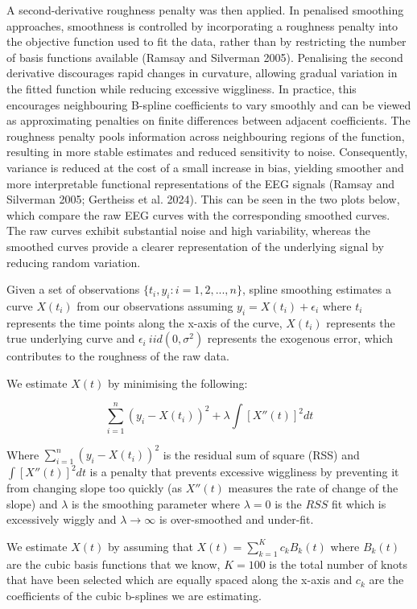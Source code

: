 \documentclass{article}
\begin{document}
A second-derivative roughness penalty was then applied. In penalised
smoothing approaches, smoothness is controlled by incorporating a
roughness penalty into the objective function used to fit the data,
rather than by restricting the number of basis functions available
(Ramsay and Silverman 2005). Penalising the second derivative
discourages rapid changes in curvature, allowing gradual variation in
the fitted function while reducing excessive wiggliness. In practice,
this encourages neighbouring B-spline coefficients to vary smoothly and
can be viewed as approximating penalties on finite differences between
adjacent coefficients. The roughness penalty pools information across
neighbouring regions of the function, resulting in more stable estimates
and reduced sensitivity to noise. Consequently, variance is reduced at
the cost of a small increase in bias, yielding smoother and more
interpretable functional representations of the EEG signals (Ramsay and
Silverman 2005; Gertheiss et al. 2024). This can be seen in the two
plots below, which compare the raw EEG curves with the corresponding
smoothed curves. The raw curves exhibit substantial noise and high
variability, whereas the smoothed curves provide a clearer
representation of the underlying signal by reducing random variation.

Given a set of observations \(\{t_i, y_i: i=1,2,...,n\}\), spline
smoothing estimates a curve \(X(t_i)\) from our observations assuming
\(y_i = X(t_i) + \epsilon_i\) where \(t_i\) represents the time points
along the x-axis of the curve, \(X(t_i)\) represents the true underlying
curve and \(\epsilon_i ~ iid(0, \sigma^2)\) represents the exogenous
error, which contributes to the roughness of the raw data.

We estimate \(X(t)\) by minimising the following:

\[\sum_{i=1}^n (y_i - X(t_i))^2 + \lambda \int [X''(t)]^2 dt\]

Where \(\sum_{i=1}^n (y_i - X(t_i))^2\) is the residual sum of square
(RSS) and \(\int [X''(t)]^2 dt\) is a penalty that prevents excessive
wiggliness by preventing it from changing slope too quickly (as
\(X''(t)\) measures the rate of change of the slope) and \(\lambda\) is
the smoothing parameter where \(\lambda = 0\) is the \(RSS\) fit which
is excessively wiggly and \(\lambda \rightarrow \infty\) is
over-smoothed and under-fit.

We estimate \(X(t)\) by assuming that \(X(t) = \sum_{k=1}^K c_k B_k(t)\)
where \(B_k(t)\) are the cubic basis functions that we know, \(K =100\)
is the total number of knots that have been selected which are equally
spaced along the x-axis and \(c_k\) are the coefficients of the cubic
b-splines we are estimating.
\end{document}
